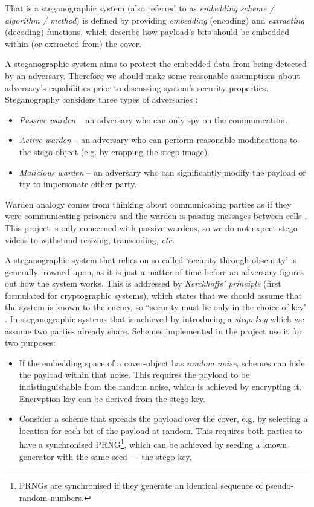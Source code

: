 \documentclass[12pt,british,twoside,notitlepage,usenames,dvipsnames,hypens,final]{report}
\numberwithin{equation}{section}
\numberwithin{figure}{section}
\begin{document}
That is a steganographic system (also referred to as \emph{embedding scheme / algorithm / method}) is defined by providing \emph{embedding} (encoding) and \emph{extracting} (decoding) functions, which describe how payload's bits should be embedded within (or extracted from) the cover.

A steganographic system aims to protect the embedded data from being detected by an adversary. Therefore we should make some reasonable assumptions about adversary's capabilities prior to discussing system's security properties. Steganography considers three types of adversaries \cite{craver1998public}:
\begin{itemize}
\item \emph{Passive warden} -- an adversary who can only spy on the communication.
\item \emph{Active warden} -- an adversary who can perform reasonable modifications to the stego-object (e.g. by cropping the stego-image).
\item \emph{Malicious warden} -- an adversary who can significantly modify the payload or try to impersonate either party.
\end{itemize}
Warden analogy comes from thinking about communicating parties as if they were communicating prisoners and the warden is passing messages between cells \cite{craver1998public}. 
This project is only concerned with passive wardens, so we do not expect stego-videos to withstand resizing, transcoding, \emph{etc.}

A steganographic system that relies on so-called `security through obscurity' is generally frowned upon, as it is just a matter of time before an adversary figures out how the system works. This is addressed by \emph{Kerckhoffs' principle} (first formulated for cryptographic systems), which states that we should assume that the system is known to the enemy, so ``security must lie only in the choice of key" \cite{infohiding-survey}. In steganographic systems that is achieved by introducing a \emph{stego-key} which we assume two parties already share. Schemes implemented in the project use it for two purposes:

\begin{itemize}
\item If the embedding space of a cover-object has \emph{random noise}, schemes can hide the payload within that noise. This requires the payload to be indistinguishable from the random noise, which is achieved by encrypting it. Encryption key can be derived from the stego-key.

\item Consider a scheme that spreads the payload over the cover, e.g. by selecting a location for each bit of the payload at random. This requires both parties to have a synchronised PRNG\footnote{PRNGs are synchronised if they generate an identical sequence of pseudo-random numbers.}, which can be achieved by seeding a known generator with the same seed --- the stego-key.
\end{itemize}
\end{document}

